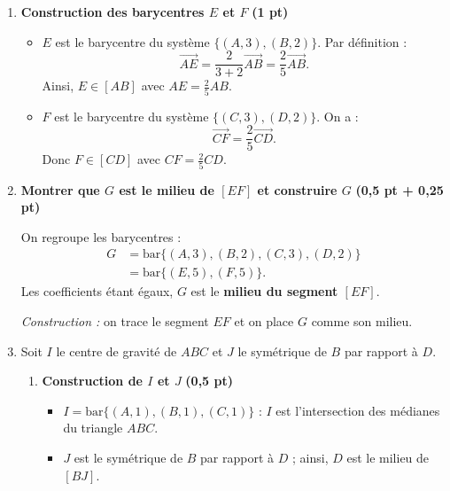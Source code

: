 \documentclass[12pt,a4paper]{article}
\begin{document}
\begin{enumerate}

\item \textbf{Construction des barycentres $E$ et $F$} \hfill \textbf{(1 pt)}

\begin{itemize}
    \item $E$ est le barycentre du système $\{(A,3),(B,2)\}$.
    Par définition :
    \[
    \overrightarrow{AE}=\frac{2}{3+2}\overrightarrow{AB}=\frac{2}{5}\overrightarrow{AB}.
    \]
    Ainsi, $E\in[AB]$ avec $AE=\frac{2}{5}AB$.

    \item $F$ est le barycentre du système $\{(C,3),(D,2)\}$.
    On a :
    \[
    \overrightarrow{CF}=\frac{2}{5}\overrightarrow{CD}.
    \]
    Donc $F\in[CD]$ avec $CF=\frac{2}{5}CD$.
\end{itemize}

\item \textbf{Montrer que $G$ est le milieu de $[EF]$ et construire $G$}
\hfill \textbf{(0,5 pt + 0,25 pt)}

On regroupe les barycentres :
\[
\begin{aligned}
G &= \mathrm{bar}\{(A,3),(B,2),(C,3),(D,2)\} \\
  &= \mathrm{bar}\{(E,5),(F,5)\}.
\end{aligned}
\]
Les coefficients étant égaux, $G$ est le \textbf{milieu du segment $[EF]$}.

\medskip
\textit{Construction :} on trace le segment $EF$ et on place $G$ comme son milieu.

\item Soit $I$ le centre de gravité de $ABC$ et $J$ le symétrique de $B$ par rapport à $D$.

\begin{enumerate}

\item \textbf{Construction de $I$ et $J$} \hfill \textbf{(0,5 pt)}

\begin{itemize}
    \item $I=\mathrm{bar}\{(A,1),(B,1),(C,1)\}$ : $I$ est l’intersection des médianes du triangle $ABC$.
    \item $J$ est le symétrique de $B$ par rapport à $D$ ; ainsi, $D$ est le milieu de $[BJ]$.
\end{itemize}


\end{enumerate}
\end{enumerate}
\end{document}
